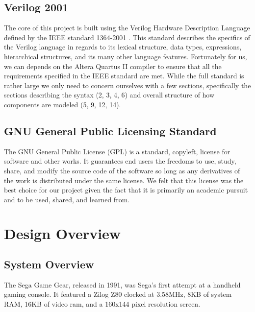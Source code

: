 \documentclass{article}
\begin{document}
\subsection{Verilog 2001}

The core of this project is built using the Verilog Hardware Description
Language defined by the IEEE standard 1364-2001 \cite{ieeeverilog}. This
standard describes the specifics of the Verilog language in regards to its
lexical structure, data types, expressions, hierarchical structures, and its
many other language features.  Fortunately for us, we can depends on the Altera
Quartus II compiler to ensure that all the requirements specified in the IEEE
standard are met. While the full standard is rather large we only need to
concern ourselves with a few sections, specifically the sections describing the
syntax (2, 3, 4, 6) and overall structure of how components are modeled (5, 9,
12, 14).

\subsection{GNU General Public Licensing Standard}

The GNU General Public License (GPL) \cite{gpl} is a standard, copyleft,
license for software and other works.  It guarantees end users the freedoms to
use, study, share, and modify the source code of the software so long as any
derivatives of the work is distributed under the same license. We felt that
this license was the best choice for our project given the fact that it is
primarily an academic pursuit and to be used, shared, and learned from.

\section{Design Overview}

\subsection{System Overview}

The Sega Game Gear, released in 1991, was Sega's first attempt at a handheld
gaming console. It featured a Zilog Z80 clocked at 3.58MHz, 8KB of system RAM,
16KB of video ram, and a 160x144 pixel resolution screen.
\end{document}
